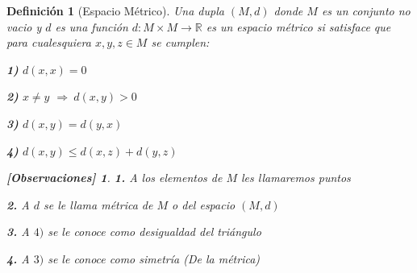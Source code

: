 \documentclass[oneside]{book} %
\theoremstyle{Teorema}
\newtheorem{Definicion}{Definición}[chapter]
\theoremstyle{Ejemplos}
\theoremstyle{[Obs]}
\newtheorem*{Obs}{[Observaciones]}
\renewcommand{\{}{\left\lbrace} %
\renewcommand{\}}{\right\rbrace} %
\newcommand{\R}{\mathbb{R}} %
\newcommand{\Imp}{$\Rightarrow\ $} %
\begin{document}
			\begin{Definicion}[Espacio Métrico]\setlength{\parindent}{0em}

				Una dupla $(M, d)$ donde $M$ es un conjunto no vacio y $d$ es una función $d : M \times M \to \R$ es un espacio métrico si satisface que para cualesquiera $x, y, z \in M$ se cumplen: 

				\textbf{1)} $d(x, x) = 0$ 

				\textbf{2)} $x \neq y$ \Imp $d(x, y) > 0$ 

				\textbf{3)} $d(x, y) = d(y, x)$ 

				\textbf{4)} $d(x, y) \leq d(x, z) + d(y, z)$ 

				\begin{Obs}

					\textbf{1.} A los elementos de $M$ les llamaremos puntos

					\textbf{2.} A $d$ se le llama métrica de $M$ o del espacio $(M, d)$ 

					\textbf{3.} A \textbf{$4)$} se le conoce como desigualdad del triángulo

					\textbf{4.} A \textbf{$3)$} se le conoce como simetría (De la métrica)
				
				\end{Obs}

			\end{Definicion}
\end{document}

